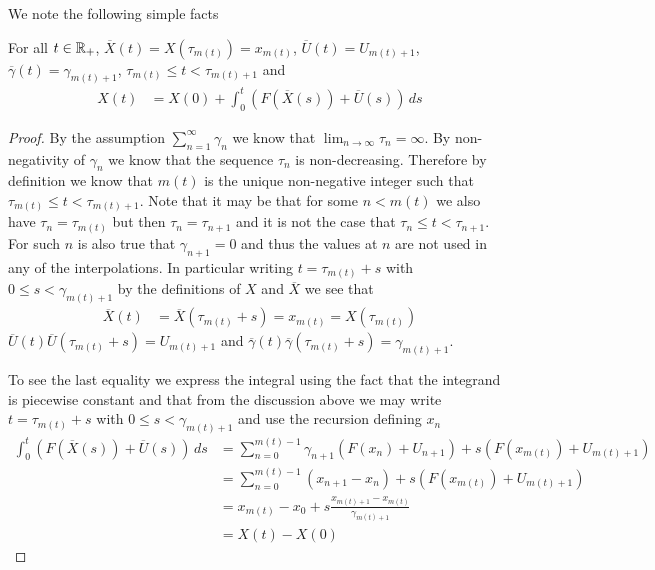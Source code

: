 We note the following simple facts
\begin{prop}\label{StochasticApproximationInterpolations}For all $t \in \mathbb{R}_+$, $\overline{X}(t) = X(\tau_{m(t)}) = x_{m(t)}$, $\overline{U}(t) = U_{m(t) + 1}$, $\overline{\gamma}(t) = \gamma_{m(t)+1}$, $\tau_{m(t)} \leq t < \tau_{m(t)+1}$
and 
\begin{align*}
X(t) &= X(0) + \int_0^t (F(\overline{X}(s)) + \overline{U}(s)) \, ds
\end{align*}
\end{prop}
\begin{proof}
By the assumption $\sum_{n=1}^\infty \gamma_n$ we know that $\lim_{n \to \infty} \tau_n = \infty$.  By non-negativity of $\gamma_n$ we know that the sequence $\tau_n$ is non-decreasing.  Therefore by definition we know that $m(t)$ is the unique non-negative integer such that $\tau_{m(t)} \leq t < \tau_{m(t)+1}$.  Note that it may be that for some $n < m(t)$ we also have $\tau_n = \tau_{m(t)}$ but then $\tau_n=\tau_{n+1}$ and it is not the case that $\tau_n \leq t < \tau_{n+1}$.  For such $n$ is also true that $\gamma_{n+1} = 0$ and thus the values at $n$ are not used in any of the interpolations.  In particular writing $t = \tau_{m(t)} +s$ with $0 \leq s < \gamma_{m(t)+1}$ by the definitions of $X$ and $\overline{X}$ we see that
\begin{align*}
\overline{X}(t) &= \overline{X}(\tau_{m(t)} + s) = x_{m(t)} = X(\tau_{m(t)})
\end{align*}
$\overline{U}(t) \overline{U}(\tau_{m(t)} + s) = U_{m(t)+1}$ and $\overline{\gamma}(t) \overline{\gamma}(\tau_{m(t)} + s) = \gamma_{m(t)+1}$.

To see the last equality we express the integral using the fact that the integrand is piecewise constant and that from the discussion above we may write $t = \tau_{m(t)} + s$ with $0 \leq s < \gamma_{m(t)+1}$ and use the recursion defining $x_n$
\begin{align*}
\int_0^t (F(\overline{X}(s)) + \overline{U}(s)) \, ds &= \sum_{n=0}^{m(t)-1} \gamma_{n+1} (F(x_n) + U_{n+1}) + s (F(x_{m(t)}) + U_{m(t)+1}) \\
&=\sum_{n=0}^{m(t)-1} (x_{n+1} - x_n)  + s (F(x_{m(t)}) + U_{m(t)+1}) \\
&= x_{m(t)} - x_0 + s \frac{x_{m(t) + 1} - x_{m(t)}}{\gamma_{m(t)+1}} \\
&= X(t) - X(0)
\end{align*}
\end{proof}

